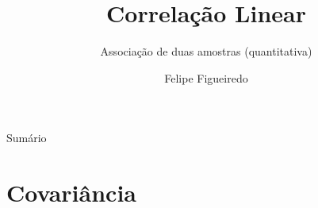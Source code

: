 \documentclass{beamer}
\title%
{Correlação Linear}
\subtitle
{Associação de duas amostras (quantitativa)} %
\author%
{Felipe Figueiredo}%
\institute[INTO] %
{Instituto Nacional de Traumatologia e Ortopedia
}
\date%
{}
\begin{document}
\begin{frame}
  \titlepage
\end{frame}

\begin{frame}{Sumário}
  \tableofcontents
\end{frame}








\section{Covariância}
\end{document}
